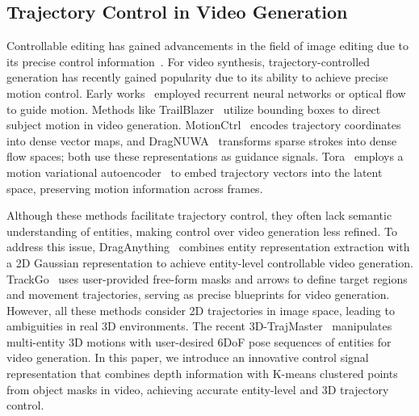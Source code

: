 \subsection{Trajectory Control in Video Generation}

Controllable editing has gained advancements in the field of image editing due to its precise control information~\cite{EpsteinJPEH23,MuGZSVWP24,YenphraphaiPLPX24,BhatMW24}. For video synthesis, trajectory-controlled generation has recently gained popularity due to its ability to achieve precise motion control. Early works~\cite{hao2018controllable, ardino2021click, blattmann2021understanding, ipoke} employed recurrent neural networks or optical flow to guide motion. Methods like TrailBlazer~\cite{trailblazer} utilize bounding boxes to direct subject motion in video generation. MotionCtrl~\cite{Motionctrl} encodes trajectory coordinates into dense vector maps, and DragNUWA~\cite{DragNUWA} transforms sparse strokes into dense flow spaces; both use these representations as guidance signals. Tora~\cite{Tora} employs a motion variational autoencoder~\cite{vae} to embed trajectory vectors into the latent space, preserving motion information across frames.

Although these methods facilitate trajectory control, they often lack semantic understanding of entities, making control over video generation less refined. To address this issue, DragAnything~\cite{DragAnything} combines entity representation extraction with a 2D Gaussian representation to achieve entity-level controllable video generation. TrackGo~\cite{TrackGo} uses user-provided free-form masks and arrows to define target regions and movement trajectories, serving as precise blueprints for video generation. However, all these methods consider 2D trajectories in image space, leading to ambiguities in real 3D environments. The recent 3D-TrajMaster~\cite{3dtrajmaster} manipulates multi-entity 3D motions with user-desired 6DoF pose sequences of entities for video generation. In this paper, we introduce an innovative control signal representation that combines depth information with K-means clustered points from object masks in video, achieving accurate entity-level and 3D trajectory control.